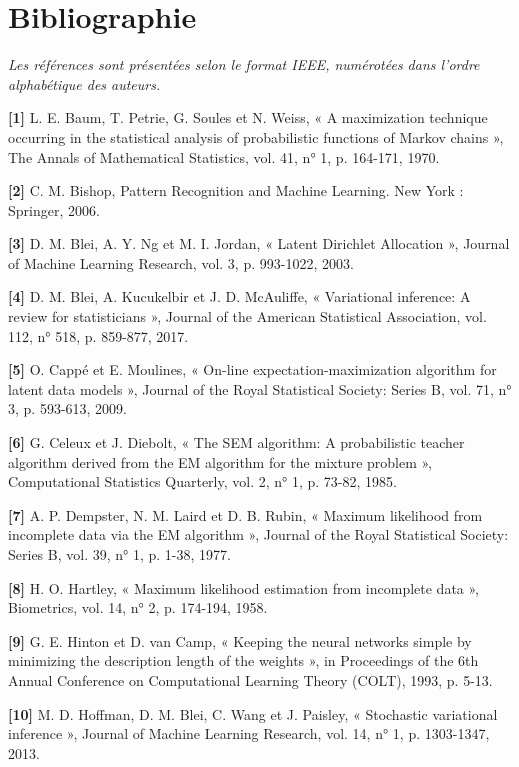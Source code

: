 \chapter*{Bibliographie}
\emph{Les références sont présentées selon le format IEEE, numérotées dans l'ordre alphabétique des auteurs.}

\textbf{[1]  }L. E. Baum, T. Petrie, G. Soules et N. Weiss, « A maximization technique occurring in the statistical analysis of probabilistic functions of Markov chains », The Annals of Mathematical Statistics, vol. 41, n° 1, p. 164-171, 1970.

\textbf{[2]  }C. M. Bishop, Pattern Recognition and Machine Learning. New York : Springer, 2006.

\textbf{[3]  }D. M. Blei, A. Y. Ng et M. I. Jordan, « Latent Dirichlet Allocation », Journal of Machine Learning Research, vol. 3, p. 993-1022, 2003.

\textbf{[4]  }D. M. Blei, A. Kucukelbir et J. D. McAuliffe, « Variational inference: A review for statisticians », Journal of the American Statistical Association, vol. 112, n° 518, p. 859-877, 2017.

\textbf{[5]  }O. Cappé et E. Moulines, « On-line expectation-maximization algorithm for latent data models », Journal of the Royal Statistical Society: Series B, vol. 71, n° 3, p. 593-613, 2009.

\textbf{[6]  }G. Celeux et J. Diebolt, « The SEM algorithm: A probabilistic teacher algorithm derived from the EM algorithm for the mixture problem », Computational Statistics Quarterly, vol. 2, n° 1, p. 73-82, 1985.

\textbf{[7]  }A. P. Dempster, N. M. Laird et D. B. Rubin, « Maximum likelihood from incomplete data via the EM algorithm », Journal of the Royal Statistical Society: Series B, vol. 39, n° 1, p. 1-38, 1977.

\textbf{[8]  }H. O. Hartley, « Maximum likelihood estimation from incomplete data », Biometrics, vol. 14, n° 2, p. 174-194, 1958.

\textbf{[9]  }G. E. Hinton et D. van Camp, « Keeping the neural networks simple by minimizing the description length of the weights », in Proceedings of the 6th Annual Conference on Computational Learning Theory (COLT), 1993, p. 5-13.

\textbf{[10]  }M. D. Hoffman, D. M. Blei, C. Wang et J. Paisley, « Stochastic variational inference », Journal of Machine Learning Research, vol. 14, n° 1, p. 1303-1347, 2013.

